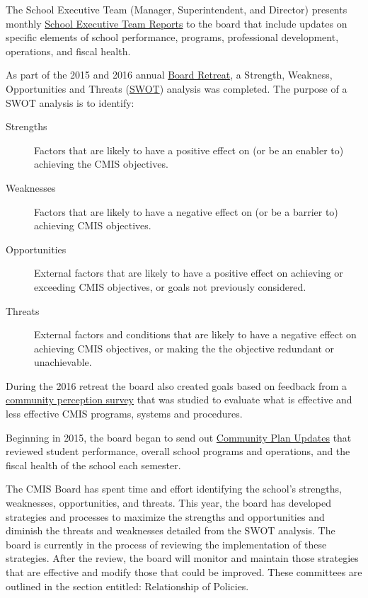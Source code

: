 \begin{findings}
The School Executive Team (Manager, Superintendent, and Director) presents monthly \href{https://docs.google.com/document/d/1gz3SiCiPUMU9n-JgGqzGQhgl0r0qAdpSfQPtBK-rwyI/edit}{School Executive Team Reports} to the board that include updates on specific elements of school performance, programs, professional development, operations, and fiscal health. 

As part of the 2015 and 2016 annual \href{https://drive.google.com/a/cmis.ac.th/file/d/0B-CVlEN-TDChSTJ6QzdQQUczT0k/view?usp=sharing}{Board Retreat}, a Strength, Weakness, Opportunities and Threats (\href{https://drive.google.com/a/cmis.ac.th/file/d/0B-CVlEN-TDChNVJudnJBNnZveTQ/view?usp=sharing}{SWOT}) analysis was completed. The purpose of a SWOT analysis is to identify:

\begin{description}
\item [Strengths] Factors that are likely to have a positive effect on (or be an enabler to) achieving the CMIS objectives.
\item [Weaknesses] Factors that are likely to have a negative effect on (or be a barrier to) achieving CMIS objectives.
\item [Opportunities] External factors that are likely to have a positive effect on achieving or exceeding CMIS objectives, or goals not previously considered.
\item [Threats] External factors and conditions that are likely to have a negative effect on achieving CMIS objectives, or making the the objective redundant or unachievable.
\end{description}

During the 2016 retreat the board also created goals based on feedback from a \href{https://docs.google.com/a/cmis.ac.th/document/d/1QoHZUrC_PbxitA2t_ZGH8DidxTLVe46HSl9otFPnE4k/edit?usp=sharing}{community perception survey} that was studied to evaluate what is effective and less effective CMIS programs, systems and procedures.

Beginning in 2015, the board began to send out \href{https://docs.google.com/a/cmis.ac.th/document/d/16DVRIWxzKBgzVMqk8coHlO97SFWthAA_DEx4z6WSHQs/edit?usp=sharing}{Community Plan Updates} that reviewed student performance, overall school programs and operations, and the fiscal health of the school each semester.  


The CMIS Board has spent time and effort identifying the school’s strengths, weaknesses, opportunities, and threats. This year, the board has developed strategies and processes to maximize the strengths and opportunities and diminish the threats and weaknesses detailed from the SWOT analysis. The board is currently in the process of reviewing the implementation of these strategies. After the review, the board will monitor and maintain those strategies that are effective and modify those that could be improved. These committees are outlined in the section entitled: Relationship of Policies. 
\end{findings}

